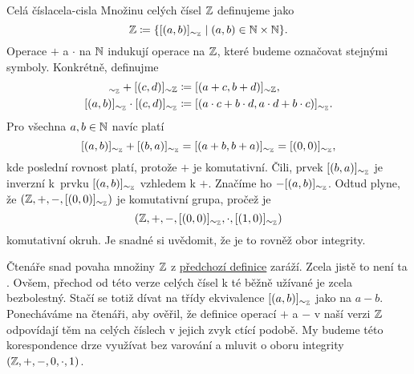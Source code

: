 \begin{definition}{Celá čísla}{cela-cisla}
 Množinu celých čísel $\mathbb{Z}$ definujeme jako
 \[
  \mathbb{Z} \coloneqq \{[(a,b)]_{ \sim _{\mathbb{Z}}} \mid (a,b) \in \mathbb{N} \times \mathbb{N}\}.
 \]
 Operace $+$ a $ \cdot $ na $\mathbb{N}$ indukují operace na $\mathbb{Z}$, které budeme
 označovat stejnými symboly. Konkrétně, definujme
 \begin{align*}
  [(a,b)]_{ \sim _{\Z}} + [(c,d)]_{ \sim \Z} &\coloneqq [(a+c,b+d)]_{ \sim
  \Z},\\
   [(a,b)]_{ \sim _{\Z}} \cdot [(c,d)]_{ \sim _{\Z}} & \coloneqq [(a \cdot c +
   b \cdot d,a \cdot d + b \cdot c)]_{ \sim _{\Z}}.
 \end{align*}
 Pro všechna $a,b \in \mathbb{N}$ navíc platí
 \[
  [(a,b)]_{ \sim _{\mathbb{Z}}} + [(b,a)]_{ \sim _{\mathbb{Z}}} = [(a+b,b+a)]_{ \sim _{\mathbb{Z}}} =
  [(0,0)]_{ \sim _{\mathbb{Z}}},
 \]
 kde poslední rovnost platí, protože $+$ je komutativní. Čili, prvek
 $[(b,a)]_{ \sim _{\mathbb{Z}}}$ je inverzní k~prvku $[(a,b)]_{ \sim _{\mathbb{Z}}}$ vzhledem k
 $+$. Značíme ho $-[(a,b)]_{ \sim _{\mathbb{Z}}}$. Odtud plyne, že $(\mathbb{Z},+,-,[(0,0)]_{
 \sim _{\mathbb{Z}}})$ je komutativní grupa, pročež je
 \[
  (\mathbb{Z},+,-,[(0,0)]_{ \sim _{\mathbb{Z}}}, \cdot ,[(1,0)]_{ \sim_{\mathbb{Z}}})
 \]
 komutativní okruh. Je snadné si uvědomit, že je to rovněž obor integrity.
\end{definition}

Čtenáře snad povaha množiny $\mathbb{Z}$ z \hyperref[def:cela-cisla]{předchozí definice}
zaráží. Zcela jistě to není ta . Ovšem, přechod od této verze celých
čísel k té běžně užívané je zcela bezbolestný. Stačí se totiž dívat na třídy
ekvivalence $[(a,b)]_{ \sim _{\mathbb{Z}}}$ jako na  $a-b$. Ponecháváme na
čtenáři, aby ověřil, že definice operací $+$ a $-$ v naší verzi $\mathbb{Z}$ odpovídají
těm na celých číslech v jejich zvyk ctící podobě. My budeme této korespondence
drze využívat bez varování a mluvit o oboru integrity $(\mathbb{Z},+,-,0, \cdot ,1)$.

